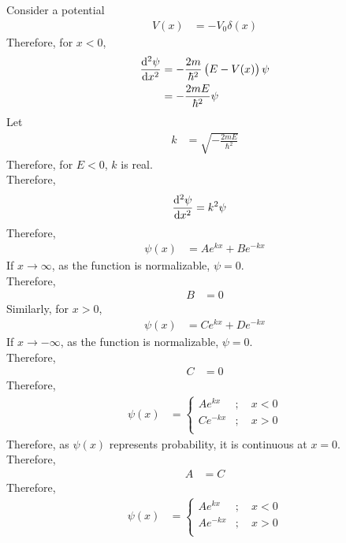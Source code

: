 \documentclass[titlepage, fleqn, a4paper, 12pt, twoside]{article}
\theoremstyle{definition}
\theoremstyle{theorem}
\begin{document}
Consider a potential
\begin{align*}
	V(x) &= -V_0 \delta(x)
\end{align*}
Therefore, for $x < 0$,
\begin{align*}
	\dod[2]{\psi}{x} &= -\frac{2 m}{\hbar^2} \left( E - V(x) \right) \psi\\
	&= -\frac{2 m E}{\hbar^2} \psi
\end{align*}
Let
\begin{align*}
	k &= \sqrt{-\frac{2 m E}{\hbar^2}}
\end{align*}
Therefore, for $E < 0$, $k$ is real.\\
Therefore,
\begin{align*}
	\dod[2]{\psi}{x} &= k^2 \psi
\end{align*}
Therefore,
\begin{align*}
	\psi(x) &= A e^{k x} + B e^{-k x}
\end{align*}
If $x \to \infty$, as the function is normalizable, $\psi = 0$.\\
Therefore,
\begin{align*}
	B &= 0
\end{align*}
Similarly, for $x > 0$,
\begin{align*}
	\psi(x) &= C e^{k x} + D e^{-k x}
\end{align*}
If $x \to -\infty$, as the function is normalizable, $\psi = 0$.\\
Therefore,
\begin{align*}
	C &= 0
\end{align*}
Therefore,
\begin{align*}
	\psi(x) &=
		\begin{cases}
			A e^{k x} &;\quad x < 0\\
			C e^{-k x} &;\quad x > 0\\
		\end{cases}
\end{align*}
Therefore, as $\psi(x)$ represents probability, it is continuous at $x = 0$.\\
Therefore,
\begin{align*}
	A &= C
\end{align*}
Therefore,
\begin{align*}
	\psi(x) &=
		\begin{cases}
			A e^{k x} &;\quad x < 0\\
			A e^{-k x} &;\quad x > 0\\
		\end{cases}
\end{align*}
\end{document}

